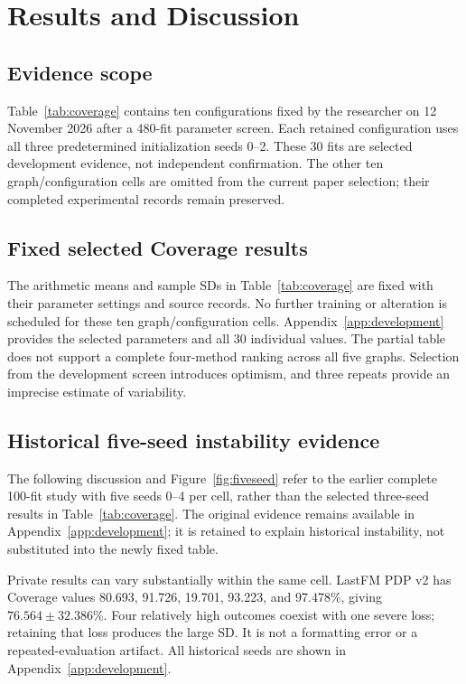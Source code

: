 \chapter{Results and Discussion}\label{ch:results}
\section{Evidence scope}
Table~\ref{tab:coverage} contains ten configurations fixed by the researcher on 12 November 2026 after a 480-fit parameter screen. Each retained configuration uses all three predetermined initialization seeds 0--2. These 30 fits are selected development evidence, not independent confirmation. The other ten graph/configuration cells are omitted from the current paper selection; their completed experimental records remain preserved.

\section{Fixed selected Coverage results}

The arithmetic means and sample SDs in Table~\ref{tab:coverage} are fixed with their parameter settings and source records. No further training or alteration is scheduled for these ten graph/configuration cells. Appendix~\ref{app:development} provides the selected parameters and all 30 individual values. The partial table does not support a complete four-method ranking across all five graphs. Selection from the development screen introduces optimism, and three repeats provide an imprecise estimate of variability.

\section{Historical five-seed instability evidence}
The following discussion and Figure~\ref{fig:fiveseed} refer to the earlier complete 100-fit study with five seeds 0--4 per cell, rather than the selected three-seed results in Table~\ref{tab:coverage}. The original evidence remains available in Appendix~\ref{app:development}; it is retained to explain historical instability, not substituted into the newly fixed table.

Private results can vary substantially within the same cell. LastFM PDP v2 has Coverage values 80.693, 91.726, 19.701, 93.223, and 97.478\%, giving $76.564\pm32.386$\%. Four relatively high outcomes coexist with one severe loss; retaining that loss produces the large SD. It is not a formatting error or a repeated-evaluation artifact. All historical seeds are shown in Appendix~\ref{app:development}.

